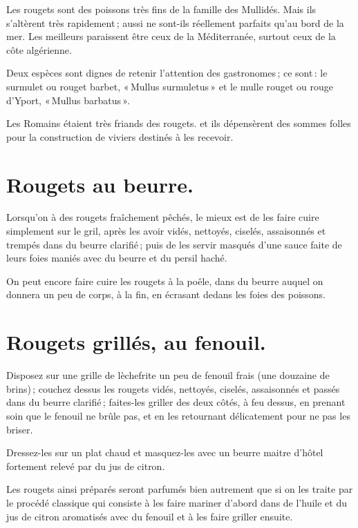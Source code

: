 Les rougets sont des poissons très fins de la famille des Mullidés. Mais ils
s'altèrent très rapidement ; aussi ne sont-ils réellement parfaits qu'au bord
de la mer. Les meilleurs paraissent être ceux de la Méditerranée, surtout ceux
de la côte algérienne.

Deux espèces sont dignes de retenir l'attention des gastronomes ; ce sont : le
surmulet ou rouget barbet, « Mullus surmuletus » et le mulle rouget ou rouge
d'Yport, « Mullus barbatus ».

Les Romains étaient très friands des rougets. et ils dépensèrent des sommes
folles pour la construction de viviers destinés à les recevoir.

\section*{\centering Rougets au beurre.}

Lorsqu'on à des rougets fraîchement pêchés, le mieux est de les faire cuire
simplement sur le gril, après les avoir vidés, nettoyés, ciselés, assaisonnés et
trempés dans du beurre clarifié ; puis de les servir masqués d’une sauce faite de
leurs foies maniés avec du beurre et du persil haché.

\sk

On peut encore faire cuire les rougets à la poêle, dans du beurre auquel on
donnera un peu de corps, à la fin, en écrasant dedans les foies des poissons.

\section*{\centering Rougets grillés, au fenouil.}

Disposez sur une grille de lèchefrite un peu de fenouil frais (une douzaine de
brins) ; couchez dessus les rougets vidés, nettoyés, ciselés, assaisonnés et
passés dans du beurre clarifié ; faites-les griller des deux côtés, à feu
dessus, en prenant soin que le fenouil ne brûle pas, et en les retournant
délicatement pour ne pas les briser.

Dressez-les sur un plat chaud et masquez-les avec un beurre maitre d'hôtel
fortement relevé par du jus de citron.

Les rougets ainsi préparés seront parfumés bien autrement que si on les traite
par le procédé classique qui consiste à les faire mariner d'abord dans de
l'huile et du jus de citron aromatisés avec du fenouil et à les faire griller
ensuite.

